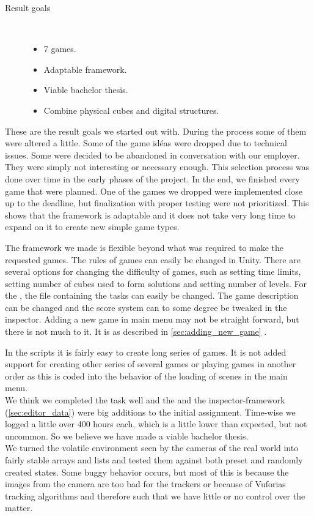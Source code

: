 \begin{description}
	\item[Result goals]\ 
	\begin{itemize}
		\item 7 games.
		\item Adaptable framework.
		\item Viable bachelor thesis.
		\item Combine physical cubes and digital structures.
	\end{itemize}
\end{description}

These are the result goals we started out with. During the process some of them
were altered a little. Some of the game id\'eas were dropped due to technical
issues. Some were decided to be abandoned in conversation with our employer.
They were simply not interesting or necessary enough. This selection process
was done over time in the early phases of the project. In the end, we finished
every game that were planned. One of the games we dropped were implemented
close up to the deadline, but finalization with proper testing were not
prioritized. This shows that the framework is adaptable and it does not take
very long time to expand on it to create new simple game types.

The framework we made is flexible beyond what was required to make the
requested games.
The rules of games can easily be changed in Unity. 
There are several options for changing the difficulty of games, such as setting time limits, setting number of cubes used to form solutions and setting number of levels.
For the \nameref{game:wo0ord_game}, the file containing the tasks can easily be changed. 
The game description can be changed and the score system can to some degree be tweaked in the inspector.
Adding a new game in main menu may not be straight forward, but there is not
much to it. It is as described in \autoref{sec:adding_new_game}
.


In the scripts it is fairly easy to create long series of games. 
It is not added support for creating other series of several games or playing games in another order as this is coded into the behavior of the loading of scenes in the main menu.\\
We think we completed the task well and the \nameref{game:wo0ord_game} and the inspector-framework (\ref{sec:editor_data}) were big additions to the initial assignment. Time-wise we logged a little over 400 hours each, which is a little lower than expected, but not uncommon. So we believe we have made a viable bachelor thesis.\\
We turned the volatile environment seen by the cameras of the real world
into fairly stable arrays and lists and tested them against both preset 
and randomly created states. Some buggy behavior occurs, but most of this
is because the images from the camera are too bad for the trackers or because
of Vuforias tracking algorithms and therefore such that we have little or no control over the matter.\\

